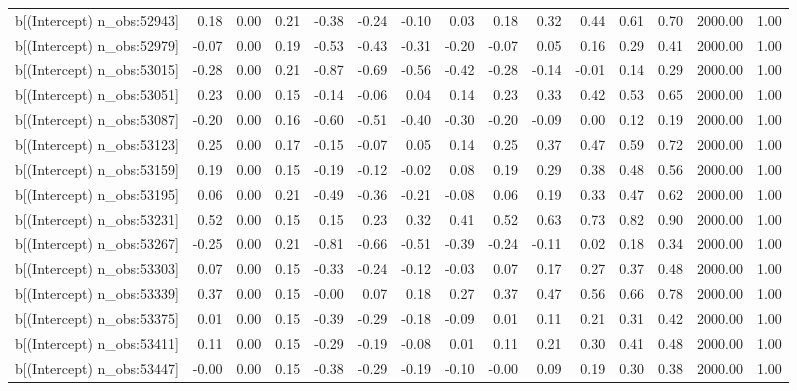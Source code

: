 \begin{table}[ht]
\begin{tabular}{rrrrrrrrrrrrrrr}
  b[(Intercept) n\_obs:52943] & 0.18 & 0.00 & 0.21 & -0.38 & -0.24 & -0.10 & 0.03 & 0.18 & 0.32 & 0.44 & 0.61 & 0.70 & 2000.00 & 1.00 \\ 
  b[(Intercept) n\_obs:52979] & -0.07 & 0.00 & 0.19 & -0.53 & -0.43 & -0.31 & -0.20 & -0.07 & 0.05 & 0.16 & 0.29 & 0.41 & 2000.00 & 1.00 \\ 
  b[(Intercept) n\_obs:53015] & -0.28 & 0.00 & 0.21 & -0.87 & -0.69 & -0.56 & -0.42 & -0.28 & -0.14 & -0.01 & 0.14 & 0.29 & 2000.00 & 1.00 \\ 
  b[(Intercept) n\_obs:53051] & 0.23 & 0.00 & 0.15 & -0.14 & -0.06 & 0.04 & 0.14 & 0.23 & 0.33 & 0.42 & 0.53 & 0.65 & 2000.00 & 1.00 \\ 
  b[(Intercept) n\_obs:53087] & -0.20 & 0.00 & 0.16 & -0.60 & -0.51 & -0.40 & -0.30 & -0.20 & -0.09 & 0.00 & 0.12 & 0.19 & 2000.00 & 1.00 \\ 
  b[(Intercept) n\_obs:53123] & 0.25 & 0.00 & 0.17 & -0.15 & -0.07 & 0.05 & 0.14 & 0.25 & 0.37 & 0.47 & 0.59 & 0.72 & 2000.00 & 1.00 \\ 
  b[(Intercept) n\_obs:53159] & 0.19 & 0.00 & 0.15 & -0.19 & -0.12 & -0.02 & 0.08 & 0.19 & 0.29 & 0.38 & 0.48 & 0.56 & 2000.00 & 1.00 \\ 
  b[(Intercept) n\_obs:53195] & 0.06 & 0.00 & 0.21 & -0.49 & -0.36 & -0.21 & -0.08 & 0.06 & 0.19 & 0.33 & 0.47 & 0.62 & 2000.00 & 1.00 \\ 
  b[(Intercept) n\_obs:53231] & 0.52 & 0.00 & 0.15 & 0.15 & 0.23 & 0.32 & 0.41 & 0.52 & 0.63 & 0.73 & 0.82 & 0.90 & 2000.00 & 1.00 \\ 
  b[(Intercept) n\_obs:53267] & -0.25 & 0.00 & 0.21 & -0.81 & -0.66 & -0.51 & -0.39 & -0.24 & -0.11 & 0.02 & 0.18 & 0.34 & 2000.00 & 1.00 \\ 
  b[(Intercept) n\_obs:53303] & 0.07 & 0.00 & 0.15 & -0.33 & -0.24 & -0.12 & -0.03 & 0.07 & 0.17 & 0.27 & 0.37 & 0.48 & 2000.00 & 1.00 \\ 
  b[(Intercept) n\_obs:53339] & 0.37 & 0.00 & 0.15 & -0.00 & 0.07 & 0.18 & 0.27 & 0.37 & 0.47 & 0.56 & 0.66 & 0.78 & 2000.00 & 1.00 \\ 
  b[(Intercept) n\_obs:53375] & 0.01 & 0.00 & 0.15 & -0.39 & -0.29 & -0.18 & -0.09 & 0.01 & 0.11 & 0.21 & 0.31 & 0.42 & 2000.00 & 1.00 \\ 
  b[(Intercept) n\_obs:53411] & 0.11 & 0.00 & 0.15 & -0.29 & -0.19 & -0.08 & 0.01 & 0.11 & 0.21 & 0.30 & 0.41 & 0.48 & 2000.00 & 1.00 \\ 
  b[(Intercept) n\_obs:53447] & -0.00 & 0.00 & 0.15 & -0.38 & -0.29 & -0.19 & -0.10 & -0.00 & 0.09 & 0.19 & 0.30 & 0.38 & 2000.00 & 1.00 \\ 

\end{tabular}
\end{table}
